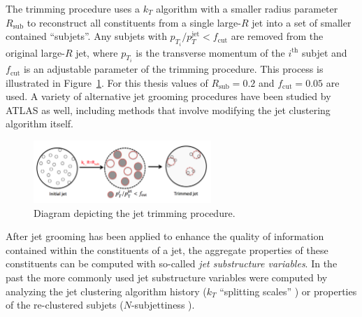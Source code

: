 The trimming procedure uses a $k_T$ algorithm with a smaller radius parameter $R_{\mathrm{sub}}$ to reconstruct all constituents from a single large-$R$ jet into a set of smaller contained ``subjets''.
Any subjets with $p_{T_i} / p_T^{\mathrm{jet}} < f_{\mathrm{cut}}$ are removed from the original large-$R$ jet, where $p_{T_i}$ is the transverse momentum of the $i^{\mathrm{th}}$ subjet and $f_{\mathrm{cut}}$ is an adjustable parameter of the trimming procedure.
This process is illustrated in Figure~\ref{fig:jet_trimming_cartoon}.
For this thesis values of $R_{\mathrm{sub}} = 0.2$ and $f_{\mathrm{cut}} = 0.05$ are used.
A variety of alternative jet grooming procedures have been studied by ATLAS \cite{Aad:2013gja} as well, including methods that involve modifying the jet clustering algorithm itself.

\begin{figure}
	\centering
	\includegraphics[width=0.6\textwidth]{jet_trimming_cartoon}
	\caption{
	Diagram depicting the jet trimming procedure.
    \cite{Aad:2013gja}
	}
	\label{fig:jet_trimming_cartoon}
\end{figure}

After jet grooming has been applied to enhance the quality of information contained within the constituents of a jet, the aggregate properties of these constituents can be computed with so-called \textit{jet substructure variables}.
In the past the more commonly used jet substructure variables were computed by analyzing the jet clustering algorithm history ($k_T$ ``splitting scales'' \cite{PhysRevD.65.096014}) or properties of the re-clustered subjets ($N$-subjettiness \cite{Thaler:2010tr}).

